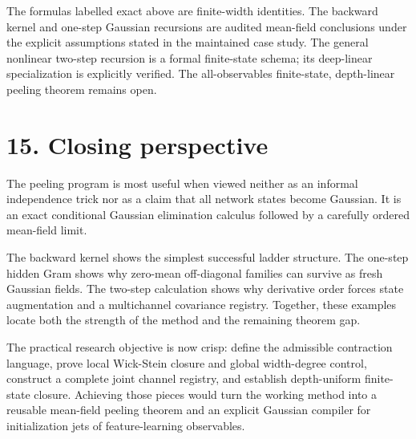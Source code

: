 The formulas labelled exact above are finite-width identities. The backward
kernel and one-step Gaussian recursions are audited mean-field conclusions
under the explicit assumptions stated in the maintained case study. The
general nonlinear two-step recursion is a formal finite-state schema; its
deep-linear specialization is explicitly verified. The all-observables
finite-state, depth-linear peeling theorem remains open.

\section*{15. Closing perspective}


The peeling program is most useful when viewed neither as an informal
independence trick nor as a claim that all network states become Gaussian.
It is an exact conditional Gaussian elimination calculus followed by a
carefully ordered mean-field limit.

The backward kernel shows the simplest successful ladder structure. The
one-step hidden Gram shows why zero-mean off-diagonal families can survive as
fresh Gaussian fields. The two-step calculation shows why derivative order
forces state augmentation and a multichannel covariance registry. Together,
these examples locate both the strength of the method and the remaining
theorem gap.

The practical research objective is now crisp: define the admissible
contraction language, prove local Wick-Stein closure and global width-degree
control, construct a complete joint channel registry, and establish
depth-uniform finite-state closure. Achieving those pieces would turn the
working method into a reusable mean-field peeling theorem and an explicit
Gaussian compiler for initialization jets of feature-learning observables.

